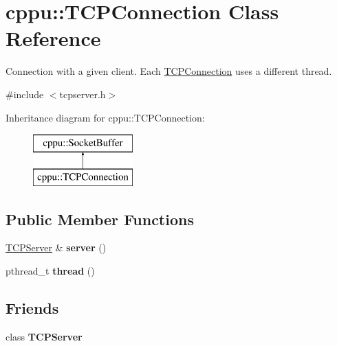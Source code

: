 \hypertarget{classcppu_1_1_t_c_p_connection}{}\section{cppu\+:\+:T\+C\+P\+Connection Class Reference}
\label{classcppu_1_1_t_c_p_connection}


Connection with a given client. Each \mbox{\hyperlink{classcppu_1_1_t_c_p_connection}{T\+C\+P\+Connection}} uses a different thread.  




{\ttfamily \#include $<$tcpserver.\+h$>$}

Inheritance diagram for cppu\+:\+:T\+C\+P\+Connection\+:\begin{figure}[H]
\begin{center}
\leavevmode
\includegraphics[height=2.000000cm]{classcppu_1_1_t_c_p_connection}
\end{center}
\end{figure}
\subsection*{Public Member Functions}
\begin{DoxyCompactItemize}
\item 
\mbox{\label{classcppu_1_1_t_c_p_connection_a4186946c7c22e3c2cebe3a97aa78f5f7}} 
\mbox{\hyperlink{classcppu_1_1_t_c_p_server}{T\+C\+P\+Server}} \& {\bfseries server} ()
\item 
\mbox{\label{classcppu_1_1_t_c_p_connection_a4663875b80fced790502880c72e6e672}} 
pthread\+\_\+t {\bfseries thread} ()
\end{DoxyCompactItemize}
\subsection*{Friends}
\begin{DoxyCompactItemize}
\item 
\mbox{\label{classcppu_1_1_t_c_p_connection_ae4cfdb1814d91a8d28dadb49adda68f0}} 
class {\bfseries T\+C\+P\+Server}
\end{DoxyCompactItemize}
